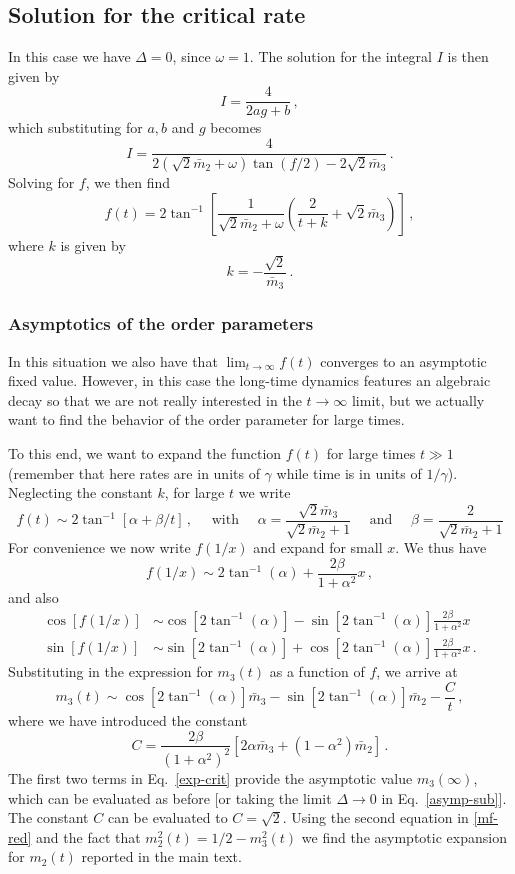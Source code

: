 \documentclass[prl,superscriptaddress,showpacs,longbibliography,reprint]{revtex4-2}
\begin{document}
\subsection{Solution for the critical rate}
In this case we have $\Delta=0$, since $\omega=1$. The solution for the integral $I$ is then given by
$$
I=\frac{4}{2ag+b}\, ,
$$
which substituting for $a,b$  and $g$ becomes
$$
I=\frac{4}{2(\sqrt{2}\bar{m}_2+\omega)\tan(f/2)-2\sqrt{2}\bar{m}_3}\, .
$$
Solving for $f$, we then find 
$$
f(t)=2\tan^{-1}\left[\frac{1}{\sqrt{2}\bar{m}_2+\omega}\left(\frac{2}{t+k}+\sqrt{2}\bar{m}_3\right)\right]\, ,
$$
where $k$ is given by 
$$
k=-\frac{\sqrt{2}}{\bar{m}_3}\, .
$$
\subsubsection{Asymptotics of the order parameters}
In this situation we also have that $\lim_{t\to\infty}f(t)$ converges to an asymptotic fixed value. However, in this case the long-time dynamics features an algebraic decay so that we are not really interested in the $t\to\infty$ limit, but we actually want to find the  behavior of the order parameter for large times. 

To this end, we want to expand the function $f(t)$ for large times $t\gg1$ (remember that here rates are in units of $\gamma$ while time is in units of $1/\gamma$). Neglecting the constant $k$, for large $t$ we write 
$$
f(t)\sim 2\tan^{-1}\left[\alpha +\beta/t\right]\, , \quad \mbox{ with }\quad  \alpha=\frac{\sqrt{2}\bar{m}_3}{\sqrt{2}\bar{m}_2+1} \quad \mbox{ and }\quad  \beta=\frac{2}{\sqrt{2}\bar{m}_2+1}
$$
For convenience we now write $f(1/x)$ and expand for small $x$. We thus have
$$
f(1/x)\sim 2\tan^{-1}(\alpha)+\frac{2\beta}{1+\alpha^2}x\, ,
$$
and also 
\begin{equation}
\begin{split}
    \cos [f(1/x)]&\sim \cos[2\tan^{-1}(\alpha)]-\sin[2\tan^{-1}(\alpha)]\frac{2\beta}{1+\alpha^2}x\\
    \sin [f(1/x)]&\sim \sin[2\tan^{-1}(\alpha)]+\cos[2\tan^{-1}(\alpha)]\frac{2\beta}{1+\alpha^2}x\, .
    \end{split}
\end{equation}
Substituting in the expression for $m_3(t)$ as a function of $f$, we arrive at 
\begin{equation}
    m_3(t)\sim \cos[2\tan^{-1}(\alpha)]\bar{m}_3-\sin[2\tan^{-1}(\alpha)]\bar{m}_2-\frac{C}{t}\, ,
    \label{exp-crit}
\end{equation}
where we have introduced the constant 
$$
C=\frac{2\beta}{(1+\alpha^2)^2}\left[2\alpha \bar{m}_3+(1-\alpha^2)\bar{m}_2\right]\, .
$$
The first two terms in Eq.~\eqref{exp-crit} provide the asymptotic value $m_3(\infty)$, which can be evaluated as before [or taking the limit $\Delta\to0$ in Eq.~\eqref{asymp-sub}]. The constant $C$ can be evaluated to $C=\sqrt{2}$. 
Using the second equation in \eqref{mf-red} and the fact that $m_2^2(t)=1/2-m_3^2(t)$ we  find the asymptotic expansion for $m_2(t)$ reported in the main text. 
\end{document}
